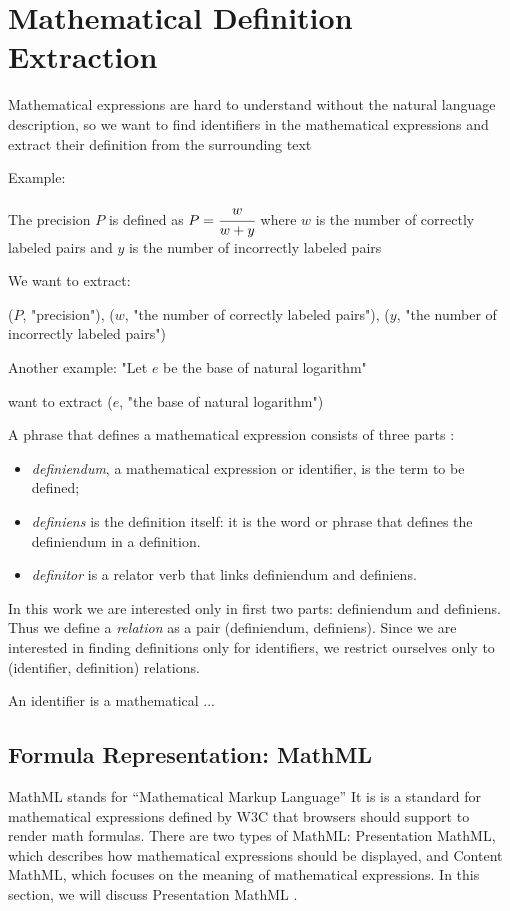 \section{Mathematical Definition Extraction}
Mathematical expressions are hard to understand without the natural language description, 
so we want to find identifiers in the mathematical expressions and extract their 
definition from the surrounding text

Example:

The precision $P$ is defined as $P = \cfrac{w}{w + y}$ where $w$ is the number of 
correctly labeled pairs and $y$ is the number of incorrectly labeled pairs

We want to extract:

($P$, "precision"), 
($w$, "the number of correctly labeled pairs"),
($y$, "the number of incorrectly labeled pairs")

Another example: "Let $e$ be the base of natural logarithm"

want to extract ($e$, "the base of natural logarithm")


A phrase that defines a mathematical expression consists of three parts \cite{kristianto2012extracting}: 

\begin{itemize}
  \item \emph{definiendum}, a mathematical expression or identifier, is the term to be defined;
  \item \emph{definiens} is the definition itself: it is the word or phrase that defines the definiendum in a definition.
  \item \emph{definitor} is a relator verb that links definiendum and definiens.
\end{itemize}
 
In this work we are interested only in first two parts: definiendum and definiens. 
Thus we define a \emph{relation} as a pair (definiendum, definiens). Since we are 
interested in finding definitions only for identifiers, we restrict ourselves only
to (identifier, definition) relations.


An identifier is a mathematical ...


\subsection{Formula Representation: MathML}

MathML \cite{mathml} stands for ``Mathematical Markup Language'' 
It is is a standard for mathematical
expressions defined by W3C that browsers should support to render math
formulas. There are two types of MathML: Presentation MathML, which describes
how mathematical expressions should be displayed, and Content MathML, which 
focuses on the meaning of mathematical expressions. In this section, we will discuss
Presentation MathML . 



